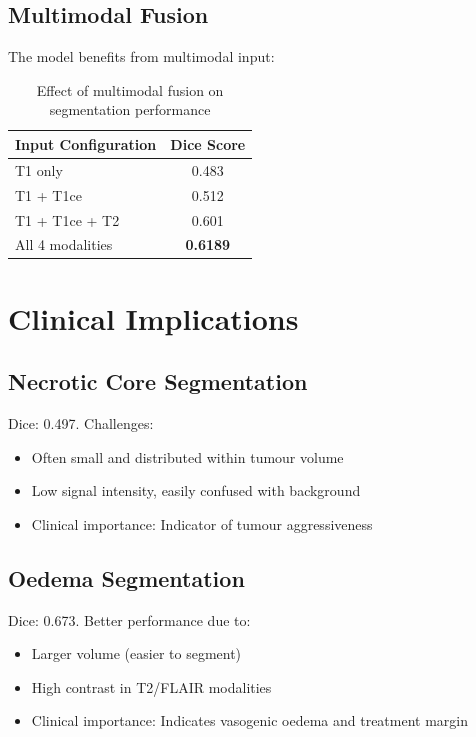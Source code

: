 \documentclass{ecsproject}     %
\begin{document}
\subsection{Multimodal Fusion}

The model benefits from multimodal input:

\begin{table}[h]
\centering
\begin{tabular}{|l|c|}
\hline
\textbf{Input Configuration} & \textbf{Dice Score} \\
\hline
T1 only & 0.483 \\
T1 + T1ce & 0.512 \\
T1 + T1ce + T2 & 0.601 \\
All 4 modalities & \textbf{0.6189} \\
\hline
\end{tabular}
\caption{Effect of multimodal fusion on segmentation performance}
\label{Table:Multimodal}
\end{table}

\section{Clinical Implications}

\subsection{Necrotic Core Segmentation}

Dice: 0.497. Challenges:
\begin{itemize}
    \item Often small and distributed within tumour volume
    \item Low signal intensity, easily confused with background
    \item Clinical importance: Indicator of tumour aggressiveness
\end{itemize}

\subsection{Oedema Segmentation}

Dice: 0.673. Better performance due to:
\begin{itemize}
    \item Larger volume (easier to segment)
    \item High contrast in T2/FLAIR modalities
    \item Clinical importance: Indicates vasogenic oedema and treatment margin
\end{itemize}
\end{document}
